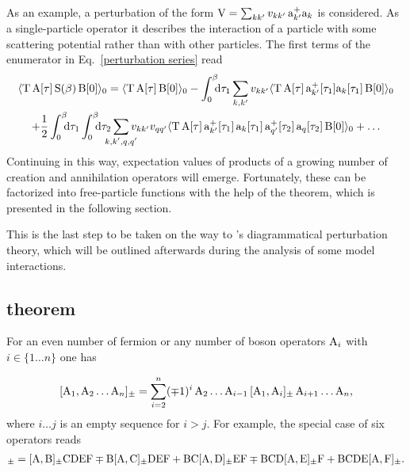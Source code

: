 As an example, a perturbation of the form $\mathrm V = \sum_{k k'} v_{k k'} \, \mathrm
a_{k'}^+ \mathrm a_k$ is considered. As a single-particle operator it describes the
interaction of a particle with some scattering potential rather than with other
particles. The first terms of the enumerator in Eq.~\ref{perturbation series}
read
%
\begin{gather*}
    \av{\op T \, \op A[\tau] \, \op S(\beta) \, \op B[0]}_0 =
    \av{\op T \, \op A[\tau] \, \op B[0]}_0 -
    \int \from 0 \till \beta \D \tau_1
    \sum_{k, k'} v_{k k'}
    \av{
        \op T \, \op A[\tau] \,
        \op a_{k'}^+[\tau_1] \op a_k[\tau_1] \,
        \op B[0]
    }_0 \\ + \frac 1 2
    \int \from 0 \till \beta \D \tau_1
    \int \from 0 \till \beta \D \tau_2
    \sum_{\mathclap{k, k', q, q'}} v_{k k'} v_{q q'}
    \av{
        \op T \, \op A[\tau] \,
        \op a_{k'}^+[\tau_1] \, \op a_k[\tau_1] \,
        \op a_{q'}^+[\tau_2] \, \op a_q[\tau_2] \,
        \op B[0]
    }_0 + \dots
\end{gather*}
%
Continuing in this way, expectation values of products of a growing number of
creation and annihilation operators will emerge. Fortunately, these can be
factorized into free-particle  functions with the help of the
 theorem, which is presented in the following section.

This is the last step to be taken on the way to 's diagrammatical
perturbation theory, which will be outlined afterwards during the analysis of
some model interactions.

\subsection{ theorem}

For an even number of fermion or any number of boson operators $\mathrm A_i$ with $i
\in \{ 1 \dots n \}$ one has

\begin{equation} \label{left to right}
    [\mathrm A_1, \mathrm A_2 \dots \mathrm A_n]_\pm =
    \sum_{i = 2}^n (\mp 1)^i \,
    \mathrm A_2 \dots \mathrm A_{i - 1} \,
    [\mathrm A_1, \mathrm A_i]_\pm \,
    \mathrm A_{i + 1} \dots \mathrm A_n,
\end{equation}
%
where $i \dots j$ is an empty sequence for $i > j$. For example, the special
case of six operators reads
%
\begin{align*}
        [\op A, \op B \op C \op D \op E \op F]_\pm
    =   [\op A, \op B]_\pm \op C \op D \op E \op F
    \mp \op B [\op A, \op C]_\pm \op D \op E \op F
    +   \op B \op C [\op A, \op D]_\pm \op E \op F
    \mp \op B \op C \op D [\op A, \op E]_\pm \op F
    +   \op B \op C \op D \op E [\op A, \op F]_\pm.
\end{align*}

